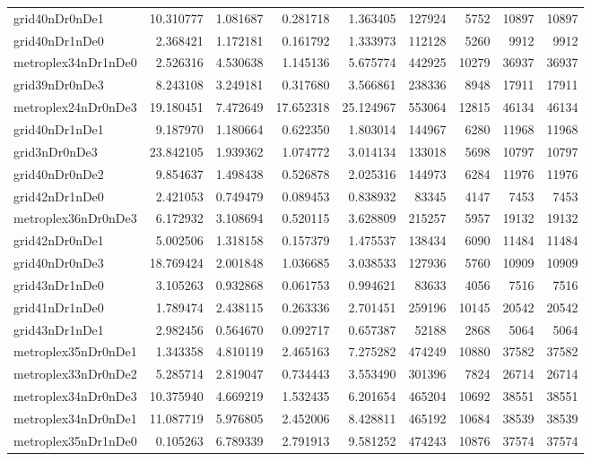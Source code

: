 \begin{longtable}{|l|r|r|r|r|r|r|r|r|}
grid40nDr0nDe1 & 10.310777 & 1.081687 & 0.281718 & 1.363405 & 127924 & 5752 & 10897 & 10897 \\
grid40nDr1nDe0 & 2.368421 & 1.172181 & 0.161792 & 1.333973 & 112128 & 5260 & 9912 & 9912 \\
metroplex34nDr1nDe0 & 2.526316 & 4.530638 & 1.145136 & 5.675774 & 442925 & 10279 & 36937 & 36937 \\
grid39nDr0nDe3 & 8.243108 & 3.249181 & 0.317680 & 3.566861 & 238336 & 8948 & 17911 & 17911 \\
metroplex24nDr0nDe3 & 19.180451 & 7.472649 & 17.652318 & 25.124967 & 553064 & 12815 & 46134 & 46134 \\
grid40nDr1nDe1 & 9.187970 & 1.180664 & 0.622350 & 1.803014 & 144967 & 6280 & 11968 & 11968 \\
grid3nDr0nDe3 & 23.842105 & 1.939362 & 1.074772 & 3.014134 & 133018 & 5698 & 10797 & 10797 \\
grid40nDr0nDe2 & 9.854637 & 1.498438 & 0.526878 & 2.025316 & 144973 & 6284 & 11976 & 11976 \\
grid42nDr1nDe0 & 2.421053 & 0.749479 & 0.089453 & 0.838932 & 83345 & 4147 & 7453 & 7453 \\
metroplex36nDr0nDe3 & 6.172932 & 3.108694 & 0.520115 & 3.628809 & 215257 & 5957 & 19132 & 19132 \\
grid42nDr0nDe1 & 5.002506 & 1.318158 & 0.157379 & 1.475537 & 138434 & 6090 & 11484 & 11484 \\
grid40nDr0nDe3 & 18.769424 & 2.001848 & 1.036685 & 3.038533 & 127936 & 5760 & 10909 & 10909 \\
grid43nDr1nDe0 & 3.105263 & 0.932868 & 0.061753 & 0.994621 & 83633 & 4056 & 7516 & 7516 \\
grid41nDr1nDe0 & 1.789474 & 2.438115 & 0.263336 & 2.701451 & 259196 & 10145 & 20542 & 20542 \\
grid43nDr1nDe1 & 2.982456 & 0.564670 & 0.092717 & 0.657387 & 52188 & 2868 & 5064 & 5064 \\
metroplex35nDr0nDe1 & 1.343358 & 4.810119 & 2.465163 & 7.275282 & 474249 & 10880 & 37582 & 37582 \\
metroplex33nDr0nDe2 & 5.285714 & 2.819047 & 0.734443 & 3.553490 & 301396 & 7824 & 26714 & 26714 \\
metroplex34nDr0nDe3 & 10.375940 & 4.669219 & 1.532435 & 6.201654 & 465204 & 10692 & 38551 & 38551 \\
metroplex34nDr0nDe1 & 11.087719 & 5.976805 & 2.452006 & 8.428811 & 465192 & 10684 & 38539 & 38539 \\
metroplex35nDr1nDe0 & 0.105263 & 6.789339 & 2.791913 & 9.581252 & 474243 & 10876 & 37574 & 37574 \\

\end{longtable}
